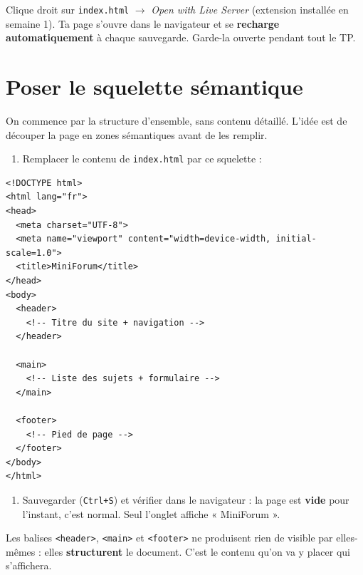 \documentclass[a4paper,11pt]{article}
\begin{document}
\begin{tcolorbox}[astuce, title={Le réflexe Live Server}]
Clique droit sur \texttt{index.html} $\rightarrow$ \textit{Open with Live Server} (extension installée en semaine 1). Ta page s'ouvre dans le navigateur et se \textbf{recharge automatiquement} à chaque sauvegarde. Garde-la ouverte pendant tout le TP.
\end{tcolorbox}

\section{Poser le squelette sémantique}

On commence par la structure d'ensemble, sans contenu détaillé. L'idée est de découper la page en zones sémantiques avant de les remplir.

\begin{enumerate}
  \item Remplacer le contenu de \texttt{index.html} par ce squelette :
\end{enumerate}

\begin{lstlisting}[language=HTML5, caption={index.html --- structure d'ensemble}]
<!DOCTYPE html>
<html lang="fr">
<head>
  <meta charset="UTF-8">
  <meta name="viewport" content="width=device-width, initial-scale=1.0">
  <title>MiniForum</title>
</head>
<body>
  <header>
    <!-- Titre du site + navigation -->
  </header>

  <main>
    <!-- Liste des sujets + formulaire -->
  </main>

  <footer>
    <!-- Pied de page -->
  </footer>
</body>
</html>
\end{lstlisting}

\begin{enumerate}[resume]
  \item Sauvegarder (\texttt{Ctrl+S}) et vérifier dans le navigateur : la page est \textbf{vide} pour l'instant, c'est normal. Seul l'onglet affiche « MiniForum ».
\end{enumerate}

\begin{tcolorbox}[attention, title={Pourquoi une page vide ?}]
Les balises \texttt{<header>}, \texttt{<main>} et \texttt{<footer>} ne produisent rien de visible par elles-mêmes : elles \textbf{structurent} le document. C'est le contenu qu'on va y placer qui s'affichera.
\end{tcolorbox}
\end{document}
